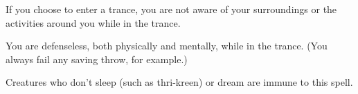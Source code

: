 {	If you choose to enter a trance, you are not aware of your surroundings or the activities around you while in the trance.

	You are defenseless, both physically and mentally, while in the trance. (You always fail any saving throw, for example.)

	Creatures who don't sleep (such as thri-kreen) or dream are immune to this spell.

}
